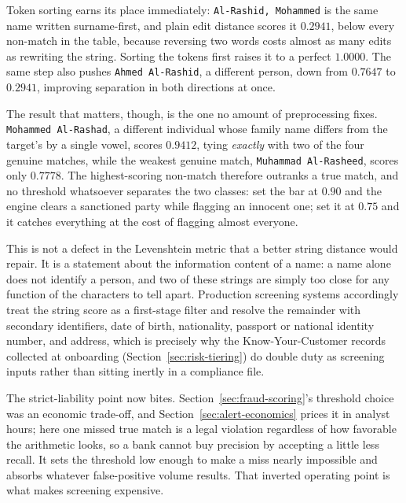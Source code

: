 \documentclass[../ai_in_finance]{subfiles}
\begin{document}
Token sorting earns its place immediately: \texttt{Al-Rashid, Mohammed} is the same name written surname-first, and plain edit distance scores it $0.2941$, below every non-match in the table, because reversing two words costs almost as many edits as rewriting the string. Sorting the tokens first raises it to a perfect $1.0000$. The same step also pushes \texttt{Ahmed Al-Rashid}, a different person, down from $0.7647$ to $0.2941$, improving separation in both directions at once.

The result that matters, though, is the one no amount of preprocessing fixes. \texttt{Mohammed Al-Rashad}, a different individual whose family name differs from the target's by a single vowel, scores $0.9412$, tying \emph{exactly} with two of the four genuine matches, while the weakest genuine match, \texttt{Muhammad Al-Rasheed}, scores only $0.7778$. The highest-scoring non-match therefore outranks a true match, and no threshold whatsoever separates the two classes: set the bar at $0.90$ and the engine clears a sanctioned party while flagging an innocent one; set it at $0.75$ and it catches everything at the cost of flagging almost everyone.

This is not a defect in the Levenshtein metric that a better string distance would repair. It is a statement about the information content of a name: a name alone does not identify a person, and two of these strings are simply too close for any function of the characters to tell apart. Production screening systems accordingly treat the string score as a first-stage filter and resolve the remainder with secondary identifiers, date of birth, nationality, passport or national identity number, and address, which is precisely why the Know-Your-Customer records collected at onboarding (Section~\ref{sec:risk-tiering}) do double duty as screening inputs rather than sitting inertly in a compliance file.

The strict-liability point now bites. Section~\ref{sec:fraud-scoring}'s threshold choice was an economic trade-off, and Section~\ref{sec:alert-economics} prices it in analyst hours; here one missed true match is a legal violation regardless of how favorable the arithmetic looks, so a bank cannot buy precision by accepting a little less recall. It sets the threshold low enough to make a miss nearly impossible and absorbs whatever false-positive volume results. That inverted operating point is what makes screening expensive.
\end{document}
